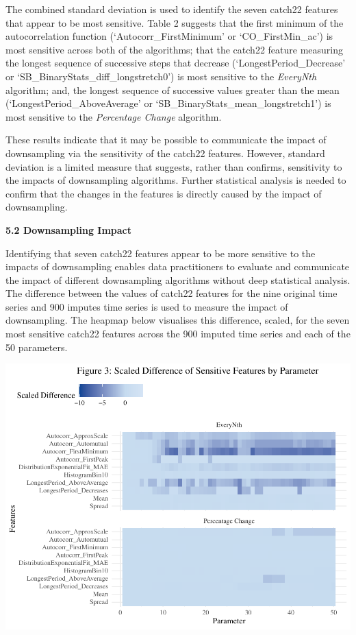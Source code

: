 \documentclass{article}
\begin{document}
\vspace{-0.5cm}

The combined standard deviation is used to identify the seven catch22
features that appear to be most sensitive. Table 2 suggests that the
first minimum of the autocorrelation function (`Autocorr\_FirstMinimum'
or `CO\_FirstMin\_ac') is most sensitive across both of the algorithms;
that the catch22 feature measuring the longest sequence of successive
steps that decrease (`LongestPeriod\_Decrease' or
`SB\_BinaryStats\_diff\_longstretch0') is most sensitive to the
\emph{EveryNth} algorithm; and, the longest sequence of successive
values greater than the mean (`LongestPeriod\_AboveAverage' or
`SB\_BinaryStats\_mean\_longstretch1') is most sensitive to the
\emph{Percentage Change} algorithm.

These results indicate that it may be possible to communicate the impact
of downsampling via the sensitivity of the catch22 features. However,
standard deviation is a limited measure that suggests, rather than
confirms, sensitivity to the impacts of downsampling algorithms. Further
statistical analysis is needed to confirm that the changes in the
features is directly caused by the impact of downsampling.

\textbf{5.2 Downsampling Impact}

Identifying that seven catch22 features appear to be more sensitive to
the impacts of downsampling enables data practitioners to evaluate and
communicate the impact of different downsampling algorithms without deep
statistical analysis. The difference between the values of catch22
features for the nine original time series and 900 imputes time series
is used to measure the impact of downsampling. The heapmap below
visualises this difference, scaled, for the seven most sensitive catch22
features across the 900 imputed time series and each of the 50
parameters.

\includegraphics{210431461_CSC8639_Dissertation_files/figure-latex/Heatmap_param-1.pdf}
\end{document}
